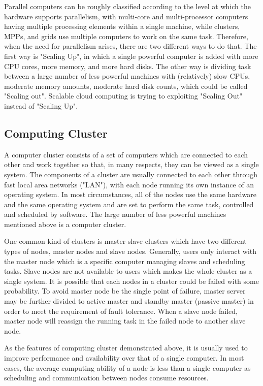 Parallel computers can be roughly classified according to the level at which the hardware supports parallelism, with multi-core and multi-processor computers having multiple processing elements within a single machine, while clusters, MPPs, and grids use multiple computers to work on the same task. Therefore, when the need for parallelism arises, there are two different ways to do that. The first way is "Scaling Up", in which a single powerful computer is added with more CPU cores, more memory, and more hard disks. The other way is dividing task between a large number of less powerful machines with (relatively) slow CPUs, moderate memory amounts, moderate hard disk counts, which could be called "Scaling out". Scalable cloud computing is trying to exploiting "Scaling Out" instead of "Scaling Up".

\subsection{Computing Cluster}
A computer cluster consists of a set of computers which are connected to each other and work together so that, in many respects, they can be viewed as a single system. The components of a cluster are usually connected to each other through fast local area networks ("LAN"), with each node running its own instance of an operating system. In most circumstances, all of the nodes use the same hardware and the same operating system and are set to perform the same task, controlled and scheduled by software. The large number of less powerful machines mentioned above is a computer cluster.

One common kind of clusters is master-slave clusters which have two different types of nodes, master nodes and slave nodes. Generally,  users only interact with the master node which is a specific computer managing slaves and scheduling tasks. Slave nodes are not available to users which makes the whole cluster as a single system. It is possible that each nodes in a cluster could be failed with some probability. To avoid master node be the single point of failure, master server may be further divided to active master and standby master (passive master) in order to meet the requirement of fault tolerance. When a slave node failed, master node will reassign the running task in the failed node to another slave node. 

As the features of computing cluster demonstrated above, it is usually used to improve performance and availability over that of a single computer. In most cases, the average computing ability of a node is less than a single computer as scheduling and communication between nodes consume resources.

